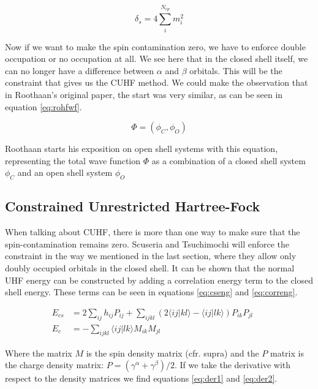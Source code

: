 \documentclass[twoside,twocolumn,9pt]{article}
\begin{document}
\begin{equation}\label{eq:spincontfinal}
  \delta_s = 4\sum^{N_{cp}}_i m_i^2
\end{equation}

Now if we want to make the spin contamination zero, we have to enforce double occupation or no occupation at all. We see here that in
the closed shell itself, we can no longer have a difference between $\alpha$ and $\beta$ orbitals. This will be the constraint that gives us the CUHF method. We could make the observation
that in Roothaan's original paper, the start was very similar, as can be seen in equation \eqref{eq:rohfwf}\cite{Roothaan1960}.

\begin{equation}\label{eq:rohfwf}
  \Phi = (\phi_C,\phi_O)
\end{equation}

Roothaan starts his exposition on open shell systems with this equation, representing the total wave function $\Phi$ as a combination of a closed shell system $\phi_C$ and
an open shell system $\phi_O$

\subsection{Constrained Unrestricted Hartree-Fock}
\label{subsec:cuhftheory}
When talking about CUHF, there is more than one way to make sure that the spin-contamination remains zero. Scuseria and Tsuchimochi will enforce the constraint in the way
we mentioned in the last section, where they allow only doubly occupied orbitals in the closed shell\cite{Scuseria2010}. It can be shown that the normal UHF energy can be
constructed by adding a correlation energy term to the closed shell energy. These terms can be seen in equations \eqref{eq:cseng} and \eqref{eq:correng}\cite{Savin2010}.

\begin{subequations}
  \begin{align}
    \label{eq:cseng}
    E_{cs} & = 2\sum_{ij}h_{ij}P_{ij} + \sum_{ijkl}(2\langle ij|kl\rangle - \langle ij|lk \rangle)P_{ik}P_{jl} &  & \\
    \label{eq:correng}
    E_c    & = -\sum_{ijkl}\langle ij|lk \rangle M_{ik}M_{jl}                                                  &  &
  \end{align}
\end{subequations}

Where the matrix $M$ is the spin density matrix (cfr. supra) and the $P$ matrix is the charge density matrix: $P = (\gamma^\alpha + \gamma^\beta)/2$. If we take the
derivative with respect to the density matrices we find equations \eqref{eq:der1} and \eqref{eq:der2}.
\end{document}
